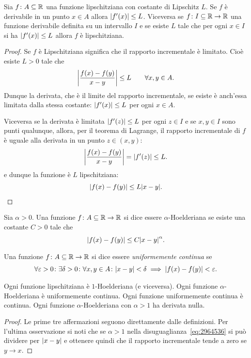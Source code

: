 \begin{theorem}
\mymark{**}
Sia $f\colon A \subseteq \mathbb R$ una funzione lipschitziana
con costante di Lipschitz $L$.
Se $f$ è derivabile in un punto $x\in A$ allora ${\left|f'(x)\right|}\le L$.
Viceversa se $f\colon I \subseteq \mathbb R \to \mathbb R$ una funzione derivabile definita su un intervallo $I$
e se esiste $L$ tale che per ogni $x\in I$ si ha ${\left|f'(x)\right|}\le L$ allora $f$ è lipschitziana.
\end{theorem}
%
\begin{proof}
Se $f$ è Lipschitziana significa che il rapporto incrementale è limitato.
Cioè esiste $L>0$ tale che
\[
  {\left|\frac{f(x) - f(y)}{x-y}\right|} \le L \qquad \forall x,y\in A.
\]
Dunque la derivata, che è il limite del rapporto incrementale, se esiste è anch'essa limitata
dalla stessa costante: ${\left|f'(x)\right|}\le L$ per ogni $x \in A$.

Viceversa se la derivata è limitata ${\left|f'(z)\right|}\le L$ per ogni $z \in I$ e se $x,y\in I$ sono punti qualunque,
allora, per il teorema di Lagrange, il rapporto incrementale di $f$ è uguale alla derivata in un punto $z\in(x,y)$:
\[
  {\left|\frac{f(x) - f(y)}{x-y}\right|} = {\left|f'(z)\right|} \le L.
\]
e dunque la funzione è $L$ lipschitziana:
\[
  {\left|f(x)- f(y)\right|} \le L {\left|x-y\right|}.
\]
\end{proof}

\begin{definition}
Sia $\alpha>0$.
Una funzione $f\colon A \subseteq \mathbb R \to \mathbb R$ si dice essere $\alpha$-Hoelderiana se
esiste una costante $C>0$ tale che
\begin{equation}\label{eq:2964536}
  {\left|f(x) - f(y)\right|} \le C {\left|x-y\right|}^\alpha.
\end{equation}
\end{definition}

\begin{definition}
\mymark{**}%
Una funzione $f\colon A \subseteq \mathbb R \to \mathbb R$ si dice essere
\emph{uniformemente continua}
%
%
%
se
\[
 \forall \varepsilon>0\colon \exists \delta > 0 \colon
 \forall x,y\in A \colon {\left|x-y\right|} < \delta \implies {\left|f(x)-f(y)\right|} < \varepsilon.
\]
\end{definition}

\begin{theorem}
Ogni funzione lipschitziana è $1$-Hoelderiana (e viceversa).
Ogni funzione $\alpha$-Hoelderiana è uniformemente continua.
Ogni funzione uniformemente continua è continua.
Ogni funzione $\alpha$-Hoelderiana con $\alpha>1$ ha derivata nulla.
\end{theorem}
%
\begin{proof}
Le prime tre affermazioni seguono direttamente dalle definizioni.
Per l'ultima osservazione si noti che se $\alpha>1$ nella
disuguaglianza~\eqref{eq:2964536} si può dividere per ${\left|x-y\right|}$ e
ottenere quindi che il rapporto incrementale tende a zero se $y\to x$.
\end{proof}

